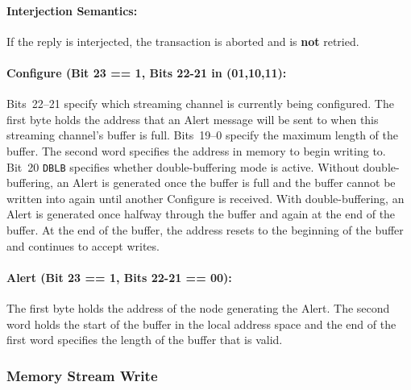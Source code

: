 \paragraph{Interjection Semantics:} If the reply is interjected, the
transaction is aborted and is {\bf not} retried.

\paragraph{Configure (Bit 23 == 1, Bits 22-21 in (01,10,11):}
\label{cmd:mem-stream-multi-conf}
Bits~22--21 specify which streaming channel is currently being configured.
The first byte holds the \bus address that an Alert message will be sent to
when this streaming channel's buffer is full.
Bits~19--0 specify the maximum length of the buffer.
The second word specifies the address in memory to begin writing to.
Bit~20 {\tt DBLB} specifies whether double-buffering mode is active. Without
double-buffering, an Alert is generated once the buffer is full and the buffer
cannot be written into again until another Configure is received. With
double-buffering, an Alert is generated once halfway through the buffer and
again at the end of the buffer. At the end of the buffer, the address resets
to the beginning of the buffer and continues to accept writes.

\paragraph{Alert (Bit 23 == 1, Bits 22-21 == 00):}
\label{cmd:mem-stream-multi-alert}
The first byte holds the address of the node generating the Alert.
The second word holds the start of the buffer in the local address space and
the end of the first word specifies the length of the buffer that is valid.


\subsubsection{Memory Stream Write}
\label{cmd:mem-stream-write}

